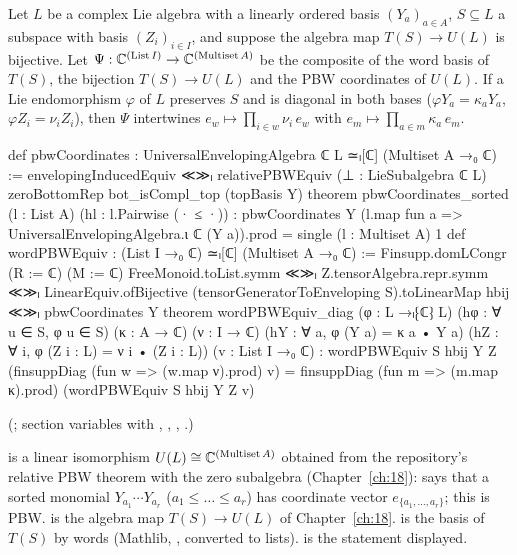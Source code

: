 \begin{theorem}\label{ch19:thm:wordpbw}
Let $L$ be a complex Lie algebra with a linearly ordered basis $(Y_a)_{a\in A}$, $S\subseteq L$ a subspace with basis
$(Z_i)_{i\in I}$, and suppose the algebra map $T(S)\to U(L)$ is bijective.  Let $\Psi:{\mathbb{C}}^{(\mathrm{List}\,I)}\to{\mathbb{C}}^{(\mathrm{Multiset}\,A)}$
be the composite of the word basis of $T(S)$, the bijection $T(S)\to U(L)$ and the PBW coordinates of $U(L)$.  If a Lie
endomorphism $\varphi$ of $L$ preserves $S$ and is diagonal in both bases ($\varphi Y_a=\kappa_aY_a$, $\varphi Z_i=\nu_iZ_i$), then
$\Psi$ intertwines $e_w\mapsto\prod_{i\in w}\nu_i\,e_w$ with $e_m\mapsto\prod_{a\in m}\kappa_a\,e_m$.
\end{theorem}
\begin{leancode}
def pbwCoordinates : UniversalEnvelopingAlgebra ℂ L ≃ₗ[ℂ] (Multiset A →₀ ℂ) :=
  envelopingInducedEquiv ≪≫ₗ
    relativePBWEquiv (⊥ : LieSubalgebra ℂ L) zeroBottomRep bot_isCompl_top (topBasis Y)
theorem pbwCoordinates_sorted (l : List A) (hl : l.Pairwise (· ≤ ·)) :
    pbwCoordinates Y (l.map fun a => UniversalEnvelopingAlgebra.ι ℂ (Y a)).prod =
      single (l : Multiset A) 1
def wordPBWEquiv : (List I →₀ ℂ) ≃ₗ[ℂ] (Multiset A →₀ ℂ) :=
  Finsupp.domLCongr (R := ℂ) (M := ℂ) FreeMonoid.toList.symm ≪≫ₗ Z.tensorAlgebra.repr.symm ≪≫ₗ
    LinearEquiv.ofBijective (tensorGeneratorToEnveloping S).toLinearMap hbij ≪≫ₗ pbwCoordinates Y
theorem wordPBWEquiv_diag (φ : L →ₗ⁅ℂ⁆ L) (hφ : ∀ u ∈ S, φ u ∈ S) (κ : A → ℂ) (ν : I → ℂ)
    (hY : ∀ a, φ (Y a) = κ a • Y a) (hZ : ∀ i, φ (Z i : L) = ν i • (Z i : L))
    (v : List I →₀ ℂ) :
    wordPBWEquiv S hbij Y Z (finsuppDiag (fun w => (w.map ν).prod) v) =
      finsuppDiag (fun m => (m.map κ).prod) (wordPBWEquiv S hbij Y Z v)
\end{leancode}
(; section variables  with \lean{[LinearOrder A]},
, ,
.)
\begin{dictionary}
 is a linear isomorphism $U(L)\cong{\mathbb{C}}^{(\mathrm{Multiset}\,A)}$ obtained from the repository's relative PBW
theorem with the zero subalgebra (Chapter~\ref{ch:18}):  says that a sorted monomial
$Y_{a_1}\cdots Y_{a_r}$ ($a_1\le\dots\le a_r$) has coordinate vector $e_{\{a_1,\dots,a_r\}}$; this is PBW.
 is the algebra map $T(S)\to U(L)$ of Chapter~\ref{ch:18}.   is the
basis of $T(S)$ by words (Mathlib, , converted to lists).   is the statement
displayed.
\end{dictionary}
